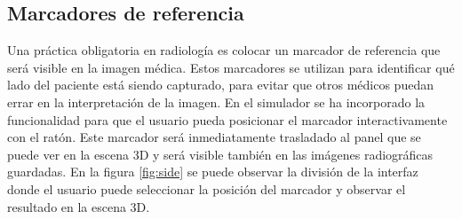 \subsection{Marcadores de referencia}
\label{xray:sidemark}
Una práctica obligatoria en radiología es colocar un marcador de referencia que será visible en la imagen médica. Estos marcadores se utilizan para identificar qué lado del paciente está siendo capturado, para evitar que otros médicos puedan errar en la interpretación de la imagen. En el simulador se ha incorporado la funcionalidad para que el usuario pueda posicionar el marcador interactivamente con el ratón. Este marcador será inmediatamente trasladado al panel que se puede ver en la escena 3D y será visible también en las imágenes radiográficas guardadas. En la figura \ref{fig:side} se puede observar la división de la interfaz donde el usuario puede seleccionar la posición del marcador y observar el resultado en la escena 3D. 

